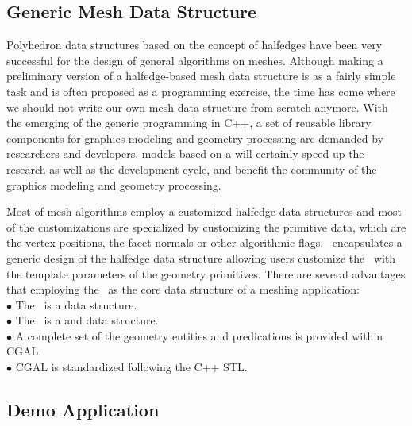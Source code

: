 \documentclass[letter,twocolumn]{article}
\begin{document}
\subsection*{Generic Mesh Data Structure}

Polyhedron data structures based on the concept of halfedges have been
very successful for the design of general algorithms on meshes.
Although making a preliminary version of a halfedge-based mesh data
structure is as a fairly simple task and is often proposed as a
programming exercise, the time has come where we should not write our
own mesh data structure from scratch anymore. With the emerging of the
generic programming in C++, a set of reusable library components for
graphics modeling and geometry processing are demanded by researchers
and developers.  models based on a
will certainly speed up the research as well as the development cycle,
and benefit the community of the graphics modeling and geometry
processing.

Most of mesh algorithms employ a customized halfedge data structures
and most of the customizations are specialized by customizing the
primitive data, which are the vertex positions, the facet normals or
other algorithmic flags. \cgalpoly\ encapsulates a generic design of
the halfedge data structure allowing users customize the \poly\ with
the template parameters of the geometry primitives. There are several
advantages that employing the \poly\ as the core data structure of a
meshing application: \\

\indent $\bullet$ The \poly\ is a  data structure.\\
\indent $\bullet$ The \poly\ is a  and  
data structure.\\
\indent $\bullet$ A complete set of the geometry entities and predications 
is provided within CGAL.\\
\indent $\bullet$ CGAL is standardized following the C++ STL.

\subsection*{Demo Application}
\end{document}
